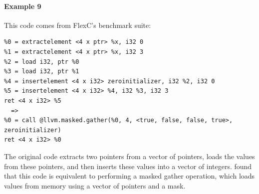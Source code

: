 \paragraph*{Example 9}

This code comes from FlexC's benchmark suite:

{\begin{quoting}\begin{Verbatim}
%0 = extractelement <4 x ptr> %x, i32 0
%1 = extractelement <4 x ptr> %x, i32 3
%2 = load i32, ptr %0
%3 = load i32, ptr %1
%4 = insertelement <4 x i32> zeroinitializer, i32 %2, i32 0
%5 = insertelement <4 x i32> %4, i32 %3, i32 3
ret <4 x i32> %5
  =>
%0 = call @llvm.masked.gather(%0, 4, <true, false, false, true>, zeroinitializer)
ret <4 x i32> %0
\end{Verbatim}
\end{quoting}}

The original code extracts two pointers from a vector of pointers,
loads the values from these pointers, and then inserts these values
into a vector of integers. \minotaur{} found that this code is equivalent
to performing a masked gather operation, which loads values from
memory using a vector of pointers and a mask.